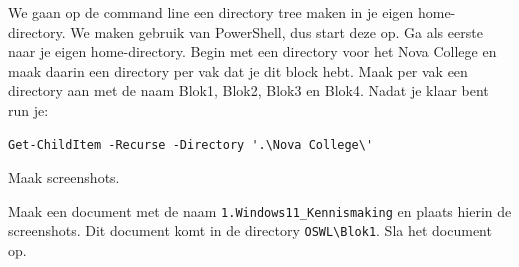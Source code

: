 We gaan op de command line een directory tree maken in je eigen home-directory. We maken gebruik van PowerShell, dus start deze op. Ga als eerste naar je eigen home-directory. Begin met een directory voor het Nova College en maak daarin een directory per vak dat je dit block hebt. Maak per vak een directory aan met de naam Blok1, Blok2, Blok3 en Blok4. Nadat je klaar bent run je:
\begin{lstlisting}[style=DOS]
Get-ChildItem -Recurse -Directory '.\Nova College\'
\end{lstlisting}

Maak screenshots.

Maak een document met de naam \texttt{1.\-Windows11\_\-Kennismaking} en plaats hierin de screenshots. Dit document komt in de directory \texttt{OSWL\textbackslash Blok1}. Sla het document op.

